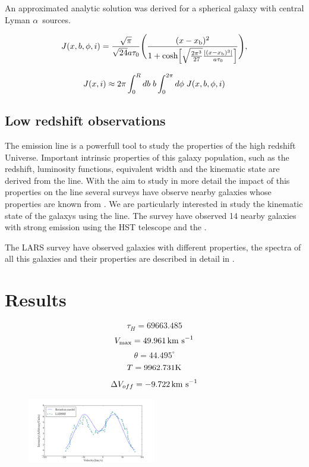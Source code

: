 \documentclass{emulateapj}
\newcommand{\ly}{{\ifmmode{{\rm Ly}\alpha~}\else{Ly$\alpha$~}\fi}}
\newcommand{\lya}{{Lyman $\alpha$~}}
\newcommand{\hs}{{\hspace{1mm}}}
\newcommand{\kms}{{\ifmmode{{\mathrm{\,km\ s}^{-1}}}\else{\,km~s$^{-1}$}\fi}}
\begin{document}
An approximated analytic solution was derived for a spherical galaxy with 
central \lya sources. 

\begin{equation}
J(x,b,\phi,i)=\frac{\sqrt{\pi}}{\sqrt{24}a\tau_0}\Bigg{(}\frac{(x-x_{\rm
    b})^2}{1+{\rm cosh}\Big{[}\sqrt{\frac{2\pi^3}{27}}\frac{|(x
      -x_{\rm b})^3|}{a\tau_0}\Big{]}}\Bigg{)},
\end{equation}


\begin{equation}
J(x,i) \approx 2\pi \int_0^Rdb \hs b
\int_0^{2\pi}d\phi \hs J(x,b,\phi,i)
\end{equation}

\subsection{Low redshift observations}

The \ly emission line is a powerfull tool to study the properties 
of the high redshift Universe. Important intrinsic properties of this
galaxy population, such as the redshift, luminosity functions, 
equivalent width and the kinematic state are derived from the 
\ly line. With the aim to study in more detail the impact of this 
properties on the \ly line several surveys have observe nearby
galaxies whose properties are known from . We are particularly
interested in study the kinematic state of the galaxys using 
the \ly line. The \citep{LARS} survey have observed 14 nearby galaxies
with strong \ly emission using the HST telescope and the .  

The LARS survey have observed galaxies with different properties, 
the spectra of all this galaxies and their properties are described 
in detail in \citep{LARS2} \citep{LARS3, LARS4}.   

\section{Results}
\label{sec:results}

$$\tau_{H} = 69663.485 $$
$$V_{\rm max} = 49.961\kms $$
$$\theta = 44.495^\circ $$
$$T = 9962.731 \rm K$$
$$\Delta V_{off} = -9.722 \kms$$

\begin{figure}[H]
\begin{center}
  \includegraphics[width=0.5\textwidth]{mcmc.png}
\end{center}
\caption{
    \label{fig:mcmc_result}}  
\end{figure}
\end{document}

